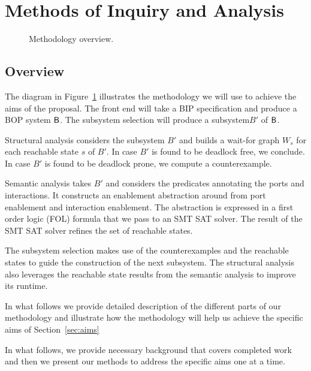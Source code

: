 \section{Methods of Inquiry and Analysis}

\begin{figure}[t]
  \begin{center}

    \resizebox{\textwidth}{!}{
     
   }
    \caption{Methodology overview.}
    \label{fig:overview}
  \end{center}
\end{figure}

\subsection{Overview} 

The diagram in Figure~\ref{fig:overview} illustrates the 
methodology we will use to achieve the aims of the proposal. 
The front end will take a BIP specification and produce
a BOP system $\mathsf{B}$. 
The subsystem selection will produce a subsystem$B'$ of $\mathsf{B}$. 

Structural analysis considers the subsystem $B'$ and builds
a wait-for graph $W_s$ for each reachable state $s$ of $B'$. 
In case $B'$ is found to be deadlock free, we conclude. 
In case $B'$ is found to be deadlock prone, we compute 
a counterexample. 

Semantic analysis takes $B'$ and considers the predicates
annotating the ports and interactions. 
It constructs an enablement abstraction around from 
port enablement and interaction enablement. 
The abstraction is expressed in a first order logic (FOL)
formula that we pass to an SMT SAT solver. 
The result of the SMT SAT solver refines the set of reachable 
states. 

The subsystem selection makes use of the counterexamples 
and the reachable states to
guide the construction of the next subsystem. 
The structural analysis also leverages the reachable state
results from the semantic analysis to improve its runtime. 

In what follows we provide detailed description of the 
different parts of our methodology and illustrate how 
the methodology will help us achieve the specific aims
of Section~\ref{sec:aims}

In what follows, we provide necessary background 
that covers completed work and then we present our 
methods to address the specific aims one at a time. 

